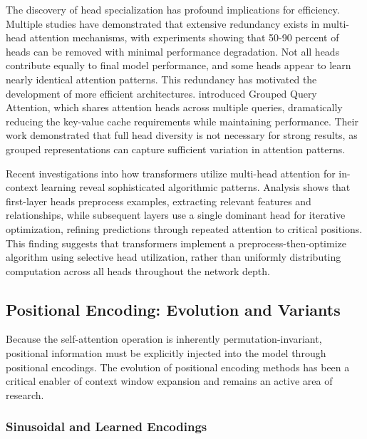 \documentclass[11pt,letterpaper]{article}
\begin{document}
The discovery of head specialization has profound implications for efficiency. Multiple studies have demonstrated that extensive redundancy exists in multi-head attention mechanisms, with experiments showing that 50-90 percent of heads can be removed with minimal performance degradation. Not all heads contribute equally to final model performance, and some heads appear to learn nearly identical attention patterns. This redundancy has motivated the development of more efficient architectures. \cite{ainslie2023gqa} introduced Grouped Query Attention, which shares attention heads across multiple queries, dramatically reducing the key-value cache requirements while maintaining performance. Their work demonstrated that full head diversity is not necessary for strong results, as grouped representations can capture sufficient variation in attention patterns.

Recent investigations into how transformers utilize multi-head attention for in-context learning reveal sophisticated algorithmic patterns. Analysis shows that first-layer heads preprocess examples, extracting relevant features and relationships, while subsequent layers use a single dominant head for iterative optimization, refining predictions through repeated attention to critical positions. This finding suggests that transformers implement a preprocess-then-optimize algorithm using selective head utilization, rather than uniformly distributing computation across all heads throughout the network depth.

\subsection{Positional Encoding: Evolution and Variants}

Because the self-attention operation is inherently permutation-invariant, positional information must be explicitly injected into the model through positional encodings. The evolution of positional encoding methods has been a critical enabler of context window expansion and remains an active area of research.

\subsubsection{Sinusoidal and Learned Encodings}
\end{document}

